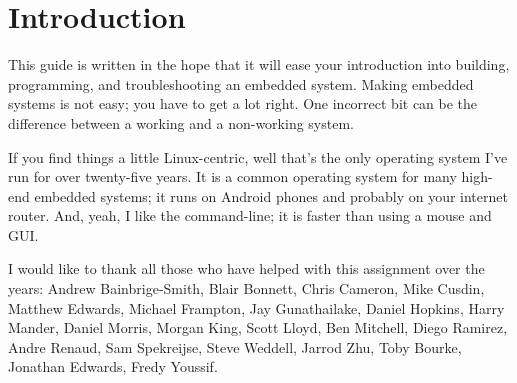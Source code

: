 \chapter{Introduction}

This guide is written in the hope that it will ease your introduction
into building, programming, and troubleshooting an embedded system.
Making embedded systems is not easy; you have to get a lot right.  One
incorrect bit can be the difference between a working and a
non-working system.

If you find things a little Linux-centric, well that's the only
operating system I've run for over twenty-five years.  It is a common
operating system for many high-end embedded systems; it runs on
Android phones and probably on your internet router.  And, yeah, I
like the command-line; it is faster than using a mouse and GUI.


I would like to thank all those who have helped with this assignment
over the years: Andrew Bainbrige-Smith, Blair Bonnett, Chris Cameron,
Mike Cusdin, Matthew Edwards, Michael Frampton, Jay Gunathailake,
Daniel Hopkins, Harry Mander, Daniel Morris, Morgan King, Scott Lloyd,
Ben Mitchell, Diego Ramirez, Andre Renaud, Sam Spekreijse, Steve
Weddell, Jarrod Zhu, Toby Bourke, Jonathan Edwards, Fredy Youssif.
